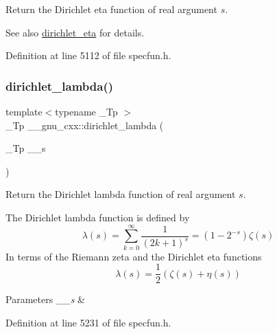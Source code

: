 Return the Dirichlet eta function of real argument $ s $.

\begin{DoxySeeAlso}{See also}
\hyperlink{group__gnu__math__spec__func_gae46e26e4107675d285c79a2d6202e6c7}{dirichlet\+\_\+eta} for details. 
\end{DoxySeeAlso}


Definition at line 5112 of file specfun.\+h.

\mbox{\label{group__gnu__math__spec__func_ga06842a81bdcabf9c62252dde992d42ee}} 
\subsubsection{\texorpdfstring{dirichlet\+\_\+lambda()}{dirichlet\_lambda()}}
{\footnotesize\ttfamily template$<$typename \+\_\+\+Tp $>$ \\
\+\_\+\+Tp \+\_\+\+\_\+gnu\+\_\+cxx\+::dirichlet\+\_\+lambda (\begin{DoxyParamCaption}\item[{\+\_\+\+Tp}]{\+\_\+\+\_\+s }\end{DoxyParamCaption})\hspace{0.3cm}{\ttfamily [inline]}}

Return the Dirichlet lambda function of real argument $ s $.

The Dirichlet lambda function is defined by \[ \lambda(s) = \sum_{k=0}^\infty \frac{1}{(2k+1)^s} = \left( 1 - 2^{-s} \right) \zeta(s) \] In terms of the Riemann zeta and the Dirichlet eta functions \[ \lambda(s) = \frac{1}{2}(\zeta(s) + \eta(s)) \]


\begin{DoxyParams}{Parameters}
{\em \+\_\+\+\_\+s} & \\
\hline
\end{DoxyParams}


Definition at line 5231 of file specfun.\+h.

\mbox{\label{group__gnu__math__spec__func_gaafd3ca6b0d71d55d3835536396eece8f}} 

